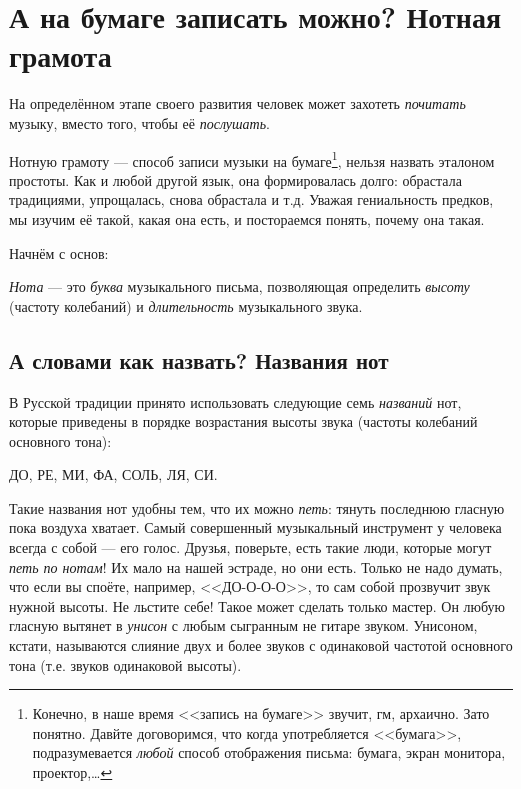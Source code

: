 \chapter{А на бумаге записать можно? Нотная грамота}
\label{ch:notes}

На определённом этапе своего развития человек может захотеть \emph{почитать} музыку, вместо того, чтобы её \emph{послушать}.

Нотную грамоту --- способ записи музыки на бумаге\footnote{Конечно, в наше время <<запись на бумаге>> звучит, гм, архаично. Зато понятно. Давйте договоримся, что когда употребляется <<бумага>>, подразумевается \emph{любой} способ отображения письма: бумага, экран монитора, проектор,\ldots}, нельзя назвать эталоном простоты. Как и любой другой язык, она формировалась долго: обрастала традициями, упрощалась, снова обрастала и т.д. Уважая гениальность предков, мы изучим её такой, какая она есть, и постораемся понять, почему она такая.

Начнём с основ:

\begin{Definition}[Нота]
    \emph{Нота} --- это \emph{буква} музыкального письма, позволяющая определить \emph{высоту} (частоту колебаний) и \emph{длительность} музыкального звука. 
\end{Definition}


\section{А словами как назвать? Названия нот}
\label{ch:notes:names}

В Русской традиции принято использовать следующие семь \emph{названий} нот, которые приведены в порядке возрастания высоты звука (частоты колебаний основного тона): 
\begin{center}
    ДО, РЕ, МИ, ФА, СОЛЬ, ЛЯ, СИ.
\end{center}

Такие названия нот удобны тем, что их можно \emph{петь}: тянуть последнюю гласную пока воздуха хватает. Самый совершенный музыкальный инструмент у человека всегда с собой --- его голос. Друзья, поверьте, есть такие люди, которые могут \emph{петь по нотам}! Их мало на нашей эстраде, но они есть. Только не надо думать, что если вы споёте, например, <<ДО-О-О-О>>, то сам собой прозвучит звук нужной высоты. Не льстите себе! Такое может сделать только мастер. Он любую гласную вытянет в \emph{унисон} с любым сыгранным не гитаре звуком. Унисоном, кстати, называются слияние двух и более звуков с одинаковой частотой основного тона (т.е. звуков одинаковой высоты).


